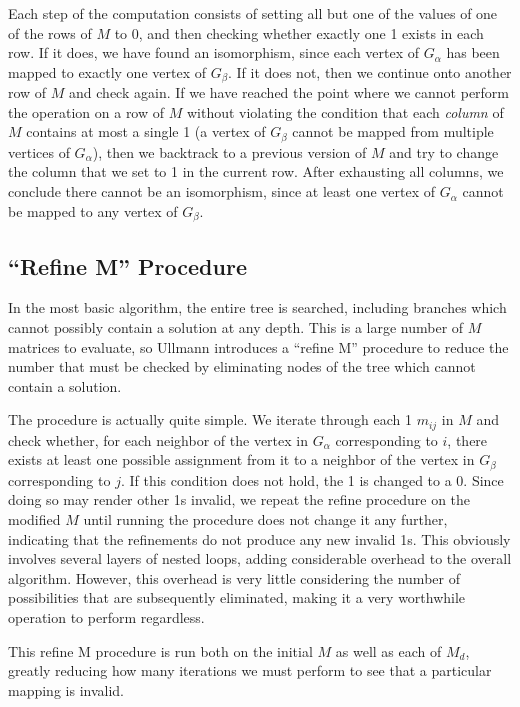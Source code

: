 \documentclass{article}
\begin{document}
  Each step of the computation consists of setting all but one of the values of one of the rows of $M$ to 0, and then checking whether exactly one 1 exists in each row. If it does, we have found an isomorphism, since each vertex of $G_\alpha$ has been mapped to exactly one vertex of $G_\beta$. If it does not, then we continue onto another row of $M$ and check again. If we have reached the point where we cannot perform the operation on a row of $M$ without violating the condition that each \textit{column} of $M$ contains at most a single 1 (a vertex of $G_\beta$ cannot be mapped from multiple vertices of $G_\alpha$), then we backtrack to a previous version of $M$ and try to change the column that we set to 1 in the current row. After exhausting all columns, we conclude there cannot be an isomorphism, since at least one vertex of $G_\alpha$ cannot be mapped to any vertex of $G_\beta$.\cite{ullmann}

  \subsection{``Refine M'' Procedure}

  In the most basic algorithm, the entire tree is searched, including branches which cannot possibly contain a solution at any depth. This is a large number of $M$ matrices to evaluate, so Ullmann introduces a ``refine M'' procedure to reduce the number that must be checked by eliminating nodes of the tree which cannot contain a solution.

  The procedure is actually quite simple. We iterate through each 1 $m_{ij}$ in $M$ and check whether, for each neighbor of the vertex in $G_\alpha$ corresponding to $i$, there exists at least one possible assignment from it to a neighbor of the vertex in $G_\beta$ corresponding to $j$. If this condition does not hold, the 1 is changed to a 0. Since doing so may render other 1s invalid, we repeat the refine procedure on the modified $M$ until running the procedure does not change it any further, indicating that the refinements do not produce any new invalid 1s. This obviously involves several layers of nested loops, adding considerable overhead to the overall algorithm. However, this overhead is very little considering the number of possibilities that are subsequently eliminated, making it a very worthwhile operation to perform regardless.

  This refine M procedure is run both on the initial $M$ as well as each of $M_d$, greatly reducing how many iterations we must perform to see that a particular mapping is invalid.
\end{document}
